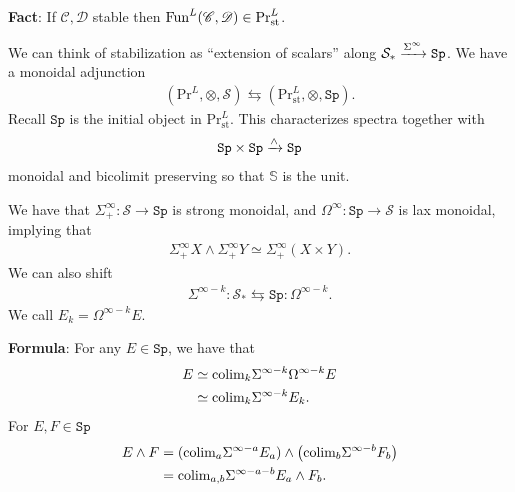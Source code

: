\documentclass[12pt]{amsart}
\theoremstyle{definition}
\let\smashprod\wedge
\providecommand{\Sp}{\texttt{Sp}}
\providecommand{\Sp}{\text{Sp}}
\providecommand{\st}{\text{st}}
\providecommand{\Pr}{\text{Pr}}
\begin{document}
\textbf{Fact}: If $\mathscr{C},\mathscr{D}$ stable then $\Fun^L(\mathscr{C},\mathscr{D})\in \Pr^L_\st$.

We can think of stabilization as ``extension of scalars'' along $\mathcal{S}_\ast \xto{\Sigma^\infty} \Sp$. We have a monoidal adjunction
\begin{align*}
    \left( \Pr^L, \otimes, \mathcal{S} \right) \leftrightarrows \left( \Pr^L_\st, \otimes, \Sp \right).
\end{align*}
Recall $\Sp$ is the initial object in $\Pr^L_\st$. This characterizes spectra together with
\begin{align*}
    \Sp \times \Sp \xto{\smashprod} \Sp
\end{align*}
monoidal and bicolimit preserving so that $\mathbb{S}$ is the unit.

We have that $\Sigma_+^\infty: \mathcal{S} \to \Sp$ is strong monoidal, and $\Omega^\infty: \Sp \to \mathcal{S}$ is lax monoidal, implying that
\begin{align*}
    \Sigma^\infty_+ X \smashprod \Sigma^\infty_+ Y \simeq \Sigma_+^\infty (X \times Y).
\end{align*}
We can also shift
\begin{align*}
    \Sigma^{\infty-k}: \mathcal{S}_\ast \leftrightarrows \Sp : \Omega^{\infty-k}.
\end{align*}
We call $E_k = \Omega^{\infty-k} E$.

\textbf{Formula}: For any $E \in \Sp$, we have that
\begin{align*}
    E &\simeq \text{colim}_k \Sigma^{\infty-k} \Omega^{\infty-k} E \\
    &\simeq \text{colim}_k \Sigma^{\infty-k} E_k.
\end{align*}
For $E,F\in\Sp$
\begin{align*}
    E \smashprod F &= (\colim_a \Sigma^{\infty-a} E_a ) \smashprod \left( \colim_b \Sigma^{\infty-b} F_b \right) \\
    &= \colim_{a,b} \Sigma^{\infty-a-b} E_a \smashprod F_b.
\end{align*}
\end{document}
